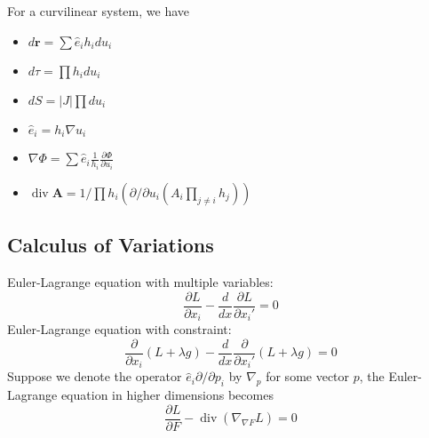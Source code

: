 \documentclass[
]{article}
\theoremstyle{definition}
\theoremstyle{definition}
\begin{document}
For a curvilinear system, we have

\begin{itemize}
  \item \(d\mathbf{r} = \sum \hat{e}_i h_i du_i\)
  \item \(d\tau = \prod h_i du_i\)
  \item \(dS = \left| J \right| \prod du_i\)
  \item \(\hat{e}_i = h_i \nabla u_i\)
  \item \(\nabla \Phi = \sum \hat{e}_i \frac{1}{h_i} \frac{\partial\Phi}{\partial u_i}\)
  \item \(\mathop{\mathrm{div}}\mathbf{A} = 1 / \prod h_i (\partial / \partial u_i (A_i \prod_{j \neq i} h_j))\)
\end{itemize}

\hypertarget{calculus-of-variations}{%
\subsection{Calculus of Variations}\label{calculus-of-variations}}

Euler-Lagrange equation with multiple variables: \[
  \frac{\partial L}{\partial x_i} - \frac{d}{dx} \frac{\partial L}{\partial x_i'} = 0
\] Euler-Lagrange equation with constraint: \[
  \frac{\partial}{\partial x_i}(L + \lambda g) - \frac{d}{dx} \frac{\partial}{\partial x_i'}(L + \lambda g) = 0
\] Suppose we denote the operator \(\hat{e}_i \partial / \partial p_i\)
by \(\nabla_p\) for some vector \(p\), the Euler-Lagrange equation in
higher dimensions becomes \[
  \frac{\partial L}{\partial F} - \mathop{\mathrm{div}}(\nabla_{\nabla F} L) = 0
\]
\end{document}
